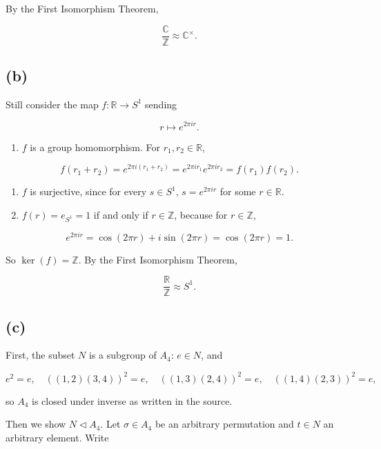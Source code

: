 By the First Isomorphism Theorem,

\[\frac{\mathbb{C}}{\mathbb{Z}} \approx \mathbb{C}^{\times}.\]

\subsection{(b)}

Still consider the map \(f:\mathbb{R}\rightarrow S^{1}\) sending

\[r\mapsto e^{2\pi ir}.\]

\begin{enumerate}
\tightlist
\item
  \(f\) is a group homomorphism. For \(r_{1},r_{2} \in \mathbb{R}\),
\end{enumerate}

\[f\left( {r_{1} + r_{2}} \right) = e^{2\pi i{({r_{1} + r_{2}})}} = e^{2\pi ir_{1}}e^{2\pi ir_{2}} = f\left( r_{1} \right)f\left( r_{2} \right).\]

\begin{enumerate}
\item
  \(f\) is surjective, since for every \(s \in S^{1}\), \(s = e^{2\pi ir}\) for some \(r \in \mathbb{R}\).
\item
  \(f(r) = e_{S^{1}} = 1\) if and only if \(r \in \mathbb{Z}\), because for \(r \in \mathbb{Z}\),
\end{enumerate}

\[e^{2\pi ir} = \cos\left( {2\pi r} \right) + i\sin\left( {2\pi r} \right) = \cos\left( {2\pi r} \right) = 1.\]

So \(\ker(f) = \mathbb{Z}\). By the First Isomorphism Theorem,

\[\frac{\mathbb{R}}{\mathbb{Z}} \approx S^{1}.\]

\subsection{(c)}

First, the subset \(N\) is a subgroup of \(A_{4}\): \(e \in N\), and

\[e^{2} = e,\quad\left( {\left( {1,2} \right)\left( {3,4} \right)} \right)^{2} = e,\quad\left( {\left( {1,3} \right)\left( {2,4} \right)} \right)^{2} = e,\quad\left( {\left( {1,4} \right)\left( {2,3} \right)} \right)^{2} = e,\]

so \(A_{4}\) is closed under inverse as written in the source.

Then we show \(N \lhd A_{4}\). Let \(\sigma \in A_{4}\) be an arbitrary permutation and \(t \in N\) an arbitrary element. Write

